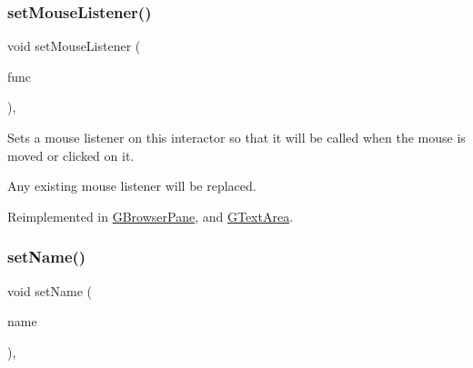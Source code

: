 \mbox{\label{classsgl_1_1GInteractor_aea7f647ea62d59f71b5fad6aa65eeaf9}} 
\subsubsection{\texorpdfstring{set\+Mouse\+Listener()}{setMouseListener()}\hspace{0.1cm}{\footnotesize\ttfamily [2/2]}}
{\footnotesize\ttfamily void set\+Mouse\+Listener (\begin{DoxyParamCaption}\item[{\mbox{\hyperlink{namespacesgl_a54427ce97bb1c2804e4fe2b0a62e8b17}{G\+Event\+Listener\+Void}}}]{func }\end{DoxyParamCaption})\hspace{0.3cm}{\ttfamily [virtual]}, {\ttfamily [inherited]}}



Sets a mouse listener on this interactor so that it will be called when the mouse is moved or clicked on it. 

Any existing mouse listener will be replaced. 

Reimplemented in \mbox{\hyperlink{classsgl_1_1GBrowserPane_a3ed42c5f929cba378927916dd73e6576}{G\+Browser\+Pane}}, and \mbox{\hyperlink{classsgl_1_1GTextArea_a3ed42c5f929cba378927916dd73e6576}{G\+Text\+Area}}.

\mbox{\label{classsgl_1_1GInteractor_a9d3a2685df23b5e7cbf59c19c4a1f9b5}} 
\subsubsection{\texorpdfstring{set\+Name()}{setName()}}
{\footnotesize\ttfamily void set\+Name (\begin{DoxyParamCaption}\item[{const std\+::string \&}]{name }\end{DoxyParamCaption})\hspace{0.3cm}{\ttfamily [virtual]}, {\ttfamily [inherited]}}



